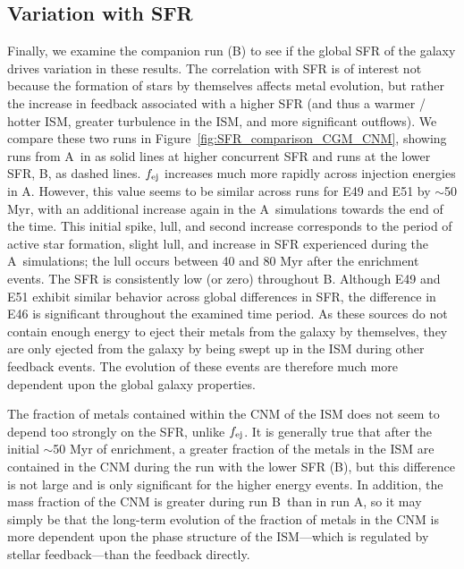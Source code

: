 \documentclass[twocolumn]{aastex62}
\newcommand{\runonenu}{A}
\newcommand{\runtwonu}{B}
\begin{document}
\subsection{Variation with SFR}
\label{sec:SFR}
Finally, we examine the companion run (\runtwonu) to see if the global SFR of the galaxy drives variation in these results. The correlation with SFR is of interest not because the formation of stars by themselves affects metal evolution, but rather the increase in feedback associated with a higher SFR (and thus a warmer / hotter ISM, greater turbulence in the ISM, and more significant outflows). We compare these two runs in Figure~\ref{fig:SFR_comparison_CGM_CNM}, showing runs from \runonenu~in as solid lines at higher concurrent SFR and runs at the lower SFR, \runtwonu, as dashed lines. $f_{\rm ej}$ increases much more rapidly across injection energies in \runonenu. However, this value seems to be similar across runs for E49 and E51 by $\sim$50 Myr, with an additional increase again in the \runonenu~simulations towards the end of the time. This initial spike, lull, and second increase corresponds to the period of active star formation, slight lull, and increase in SFR experienced during the \runonenu~simulations; the lull occurs between 40 and 80 Myr after the enrichment events. The SFR is consistently low (or zero) throughout \runtwonu. Although E49 and E51 exhibit similar behavior across global differences in SFR, the difference in E46 is significant throughout the examined time period. As these sources do not contain enough energy to eject their metals from the galaxy by themselves, they are only ejected from the galaxy by being swept up in the ISM during other feedback events. The evolution of these events are therefore much more dependent upon the global galaxy properties.

The fraction of metals contained within the CNM of the ISM does not seem to depend too strongly on the SFR, unlike $f_{\rm ej}$. It is generally true that after the initial $\sim$50 Myr of enrichment, a greater fraction of the metals in the ISM are contained in the CNM during the run with the lower SFR (\runtwonu), but this difference is not large and is only significant for the higher energy events. In addition, the mass fraction of the CNM is greater during run \runtwonu~than in run \runonenu, so it may simply be that the long-term evolution of the fraction of metals in the CNM is more dependent upon the phase structure of the ISM---which is regulated by stellar feedback---than the feedback directly.
\end{document}
